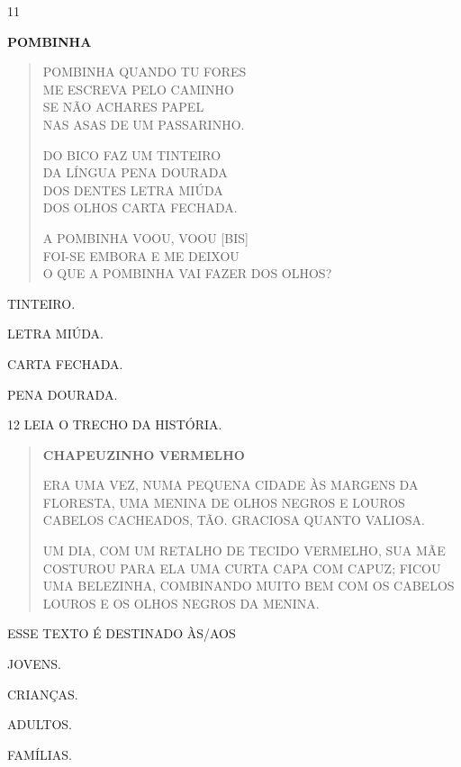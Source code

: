 \num{11}

\textbf{POMBINHA}

\begin{verse}
POMBINHA QUANDO TU FORES\\
ME ESCREVA PELO CAMINHO\\
SE NÃO ACHARES PAPEL\\
NAS ASAS DE UM PASSARINHO.

DO BICO FAZ UM TINTEIRO\\
DA LÍNGUA PENA DOURADA\\
DOS DENTES LETRA MIÚDA\\
DOS OLHOS CARTA FECHADA.

A POMBINHA VOOU, VOOU {[}BIS{]}\\
FOI-SE EMBORA E ME DEIXOU\\
O QUE A POMBINHA VAI FAZER DOS OLHOS?
\end{verse}

\begin{escolha}
\item TINTEIRO.

\item LETRA MIÚDA.

\item CARTA FECHADA.

\item PENA DOURADA.
\end{escolha}


\num{12} LEIA O TRECHO DA HISTÓRIA.

\begin{quote}
\textbf{CHAPEUZINHO VERMELHO}

ERA UMA VEZ, NUMA PEQUENA CIDADE ÀS MARGENS DA FLORESTA,
UMA MENINA DE OLHOS NEGROS E LOUROS CABELOS CACHEADOS, TÃO.
GRACIOSA QUANTO VALIOSA.

UM DIA, COM UM RETALHO DE TECIDO VERMELHO, SUA MÃE
COSTUROU PARA ELA UMA CURTA CAPA COM CAPUZ; FICOU UMA
BELEZINHA, COMBINANDO MUITO BEM COM OS CABELOS LOUROS E
OS OLHOS NEGROS DA MENINA.
\end{quote}


ESSE TEXTO É DESTINADO ÀS/AOS 

\begin{escolha}
\item JOVENS.

\item CRIANÇAS.

\item ADULTOS.

\item FAMÍLIAS.
\end{escolha}

